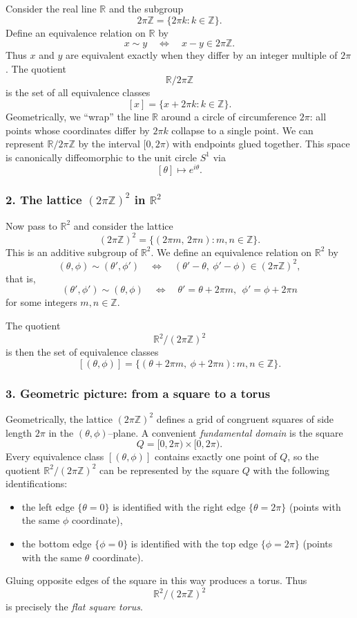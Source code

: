 \documentclass[12pt,a4paper]{article}
\theoremstyle{plain}
\theoremstyle{definition}      %
\begin{document}
Consider the real line $\mathbb{R}$ and the subgroup
\[
2\pi\mathbb{Z} = \{ 2\pi k : k\in\mathbb{Z}\}.
\]
Define an equivalence relation on $\mathbb{R}$ by
\[
x \sim y
\quad\Longleftrightarrow\quad
x-y \in 2\pi\mathbb{Z}.
\]
Thus $x$ and $y$ are equivalent exactly when they differ by an integer
multiple of $2\pi$.  The quotient
\[
\mathbb{R}/2\pi\mathbb{Z}
\]
is the set of all equivalence classes
\[
[x] = \{ x + 2\pi k : k\in\mathbb{Z}\}.
\]
Geometrically, we ``wrap'' the line $\mathbb{R}$ around a circle of
circumference $2\pi$: all points whose coordinates differ by $2\pi k$
collapse to a single point.  We can represent $\mathbb{R}/2\pi\mathbb{Z}$
by the interval $[0,2\pi)$ with endpoints glued together.  This space is
canonically diffeomorphic to the unit circle $S^{1}$ via
\[
[\theta] \longmapsto e^{i\theta}.
\]

\subsubsection*{2. The lattice $(2\pi\mathbb{Z})^{2}$ in $\mathbb{R}^{2}$}

Now pass to $\mathbb{R}^{2}$ and consider the lattice
\[
(2\pi\mathbb{Z})^{2}
= \{ (2\pi m,\,2\pi n) : m,n\in\mathbb{Z}\}.
\]
This is an additive subgroup of $\mathbb{R}^{2}$.  We define an
equivalence relation on $\mathbb{R}^{2}$ by
\[
(\theta,\phi) \sim (\theta',\phi')
\quad\Longleftrightarrow\quad
(\theta'-\theta,\ \phi'-\phi) \in (2\pi\mathbb{Z})^{2},
\]
that is,
\[
(\theta',\phi') \sim (\theta,\phi)
\quad\Longleftrightarrow\quad
\theta' = \theta + 2\pi m,\ \ \phi' = \phi + 2\pi n
\]
for some integers $m,n\in\mathbb{Z}$.

The quotient
\[
\mathbb{R}^{2}/(2\pi\mathbb{Z})^{2}
\]
is then the set of equivalence classes
\[
[(\theta,\phi)]
= \{ (\theta+2\pi m,\ \phi+2\pi n) : m,n\in\mathbb{Z}\}.
\]

\subsubsection*{3. Geometric picture: from a square to a torus}

Geometrically, the lattice $(2\pi\mathbb{Z})^{2}$ defines a grid of
congruent squares of side length $2\pi$ in the $(\theta,\phi)$--plane.
A convenient \emph{fundamental domain} is the square
\[
Q = [0,2\pi) \times [0,2\pi).
\]
Every equivalence class $[(\theta,\phi)]$ contains exactly one point of
$Q$, so the quotient $\mathbb{R}^{2}/(2\pi\mathbb{Z})^{2}$ can be
represented by the square $Q$ with the following identifications:
\begin{itemize}
	\item the left edge $\{\theta=0\}$ is identified with the right edge
	$\{\theta=2\pi\}$ (points with the same $\phi$ coordinate),
	\item the bottom edge $\{\phi=0\}$ is identified with the top edge
	$\{\phi=2\pi\}$ (points with the same $\theta$ coordinate).
\end{itemize}
Gluing opposite edges of the square in this way produces a torus.  Thus
\[
\mathbb{R}^{2}/(2\pi\mathbb{Z})^{2}
\]
is precisely the \emph{flat square torus}.
\end{document}
